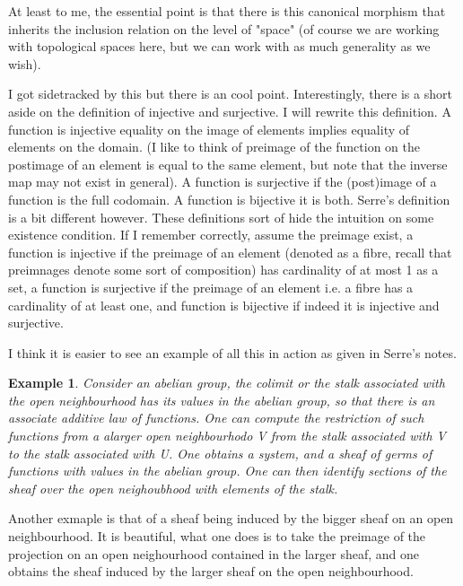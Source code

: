 \documentclass[12pt]{article}
\newtheorem{example}{Example}
\begin{document}
At least to me, the essential point is that there is this canonical morphism that inherits the inclusion relation on the level of "space" (of course we are working with topological spaces here, but we can work with as much generality as we wish).

I got sidetracked by this but there is an cool point. Interestingly, there is a short aside on the definition of injective and surjective. I will rewrite this definition. A function is injective equality on the image of elements implies equality of elements on the domain. (I like to think of preimage of the function on the postimage of an element is equal to the same element, but note that the inverse map may not exist in general). A function is surjective if the (post)image of a function is the full codomain. A function is bijective it is both. Serre's definition is a bit different however. These definitions sort of hide the intuition on some existence condition. If I remember correctly, assume the preimage exist, a function is injective if the preimage of an element (denoted as a fibre, recall that preimnages denote some sort of composition) has cardinality of at most 1 as a set, a function is surjective if the preimage of an element i.e. a fibre has a cardinality of at least one, and function is bijective if indeed it is injective and surjective.

I think it is easier to see an example of all this in action as given in Serre's notes.

\begin{example}
    Consider an abelian group, the colimit or the stalk associated with the open neighbourhood has its values in the abelian group, so that there is an associate additive law of functions. One can compute the restriction of such functions from a alarger open neighbourhodo V from the stalk associated with V to the stalk associated with U. One obtains a system, and a sheaf of germs of functions with values in the abelian group. One can then identify sections of the sheaf over the open neighoubhood with elements of the stalk.
\end{example}

Another exmaple is that of a sheaf being induced by the bigger sheaf on an open neighbourhood. It is beautiful, what one does is to take the preimage of the projection on an open neighourhood contained in the larger sheaf, and one obtains the sheaf induced by the larger sheaf on the open neighbourhood.
\end{document}
